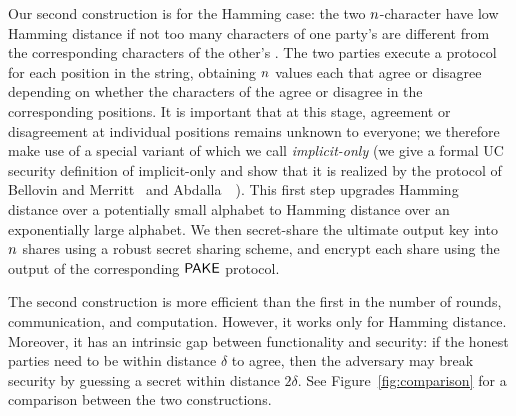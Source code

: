 Our second construction is for the Hamming case: the two $n$-character \passwords have low Hamming distance if not too many characters of one party's \password are different from the corresponding characters of the other's \password. 
The two parties execute a \PAKE protocol for each position in the string, obtaining $n$ values each that agree or disagree depending on whether the characters of the \password agree or disagree in the corresponding positions. 
It is important that at this stage, agreement or disagreement at individual positions remains unknown to everyone; we therefore make use of a special variant of \PAKE which we call \emph{implicit-only \PAKE} 
(we give a formal UC security definition of implicit-only \PAKE and show that it is realized by the \PAKE protocol of Bellovin and Merritt~\cite{SP:BelMer92} and Abdalla~\etal~\cite{RSA:ACCP08}). 
This first step upgrades Hamming distance over a potentially small alphabet to Hamming distance over an exponentially large alphabet. 
We then secret-share the ultimate output key into $n$ shares using a robust secret sharing scheme, and encrypt each share using the output of the corresponding $\textsf{PAKE}$ protocol. 

The second construction is more efficient than the first in the number of rounds, communication, and computation. 
However, it works only for Hamming distance. 
Moreover, it has an intrinsic gap between functionality and security: if the honest parties need to be within distance $\delta$ to agree, then the adversary may break security by guessing a secret within distance $2\delta$.
See Figure~\ref{fig:comparison} for a comparison between the two constructions.


